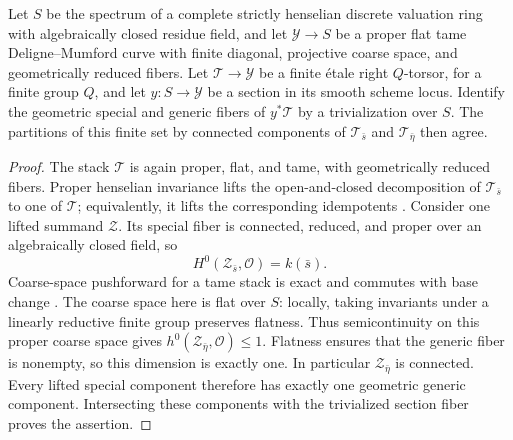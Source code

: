 \begin{lemma}\label{lem:component-orbits}
Let $S$ be the spectrum of a complete strictly henselian discrete
valuation ring with algebraically closed residue field, and let
$\mathcal Y\to S$ be a proper flat tame Deligne--Mumford curve with
finite diagonal, projective coarse space, and geometrically reduced
fibers.  Let $\mathcal T\to\mathcal Y$ be a finite \'etale right
$Q$-torsor, for a finite group $Q$, and let $y:S\to\mathcal Y$ be a
section in its smooth scheme locus.  Identify the geometric special
and generic fibers of $y^*\mathcal T$ by a trivialization over $S$.
The partitions of this finite set by connected components of
$\mathcal T_{\bar s}$ and $\mathcal T_{\bar\eta}$ then agree.
\end{lemma}

\begin{proof}
The stack $\mathcal T$ is again proper, flat, and tame, with
geometrically reduced fibers.  Proper henselian invariance lifts the
open-and-closed decomposition of $\mathcal T_{\bar s}$ to one of
$\mathcal T$; equivalently, it lifts the corresponding idempotents
\cite[Theorem~4.5]{Rydh}.  Consider one lifted summand $\mathcal Z$.
Its special fiber is connected, reduced, and proper over an
algebraically closed field, so
\[
             H^0(\mathcal Z_{\bar s},\mathcal O)=k(\bar s).
\]
Coarse-space pushforward for a tame stack is exact and commutes with
base change \cite[Lemmas~2.3.3--2.3.4]{AbramovichVistoli}.  The coarse space
here is flat over $S$: locally, taking
invariants under a linearly reductive finite group preserves flatness.
Thus semicontinuity on this proper coarse space gives
$h^0(\mathcal Z_{\bar\eta},\mathcal O)\leq1$.  Flatness ensures that
the generic fiber is nonempty, so this dimension is exactly one.
In particular $\mathcal Z_{\bar\eta}$ is connected.  Every lifted
special component therefore has exactly one geometric generic
component.  Intersecting these components with the trivialized
section fiber proves the assertion.
\end{proof}

